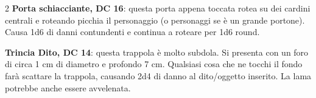 \begin{multicols}{2}
\textbf{Porta schiacciante, DC 16}: questa porta appena toccata rotea su dei cardini centrali e roteando picchia il personaggio (o personaggi se è un grande portone). Causa 1d6 di danni contundenti e continua a roteare per 1d6 round.

\textbf{Trincia Dito, DC 14}: questa trappola è molto subdola. Si presenta con un foro di circa 1 cm di diametro e profondo 7 cm. Qualsiasi cosa che ne tocchi il fondo farà scattare la trappola, causando 2d4 di danno al dito/oggetto inserito. La lama potrebbe anche essere avvelenata.

\end{multicols}




\pagebreak

